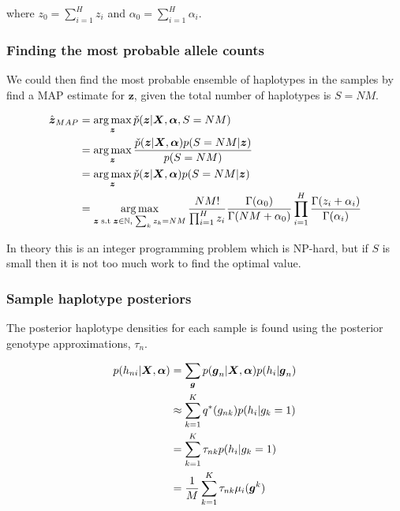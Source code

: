 \documentclass{article}
\DeclareMathOperator*{\argmax}{arg\,max}
\begin{document}
where $z_0 = \sum_{i = 1}^H z_i$ and $\alpha_0 = \sum_{i = 1}^H \alpha_i$.

\subsubsection{Finding the most probable allele counts}

We could then find the most probable ensemble of haplotypes in the samples by find a MAP estimate for $\boldsymbol{z}$, given the total number of haplotypes is $S = NM$.

\begin{align}
    \hat{\boldsymbol{z}}_{MAP} &= \argmax_{\boldsymbol{z}} \check{p}(\boldsymbol{z} | \boldsymbol{X}, \boldsymbol{\alpha}, S = NM)\notag\\
    &= \argmax_{\boldsymbol{z}} \frac{\check{p}(\boldsymbol{z} | \boldsymbol{X}, \boldsymbol{\alpha})p(S = NM | \boldsymbol{z})}{p(S = NM)}\notag\\
    &= \argmax_{\boldsymbol{z}} \check{p}(\boldsymbol{z} | \boldsymbol{X}, \boldsymbol{\alpha})p(S = NM | \boldsymbol{z})\notag\\
    &= \argmax_{\boldsymbol{z} \; \text{s.t} \; \boldsymbol{z} \in \mathbb{N},\; \sum_k z_k = NM} \frac{NM!}{\prod_{i = 1}^{H} z_i} \frac{\Gamma(\alpha_0)}{\Gamma(NM + \alpha_0)} \prod_{i = 1}^H \frac{\Gamma(z_i + \alpha_i)}{\Gamma(\alpha_i)}
\end{align}

In theory this is an integer programming problem which is NP-hard, but if $S$ is small then it is not too much work to find the optimal value.

\subsubsection{Sample haplotype posteriors}

The posterior haplotype densities for each sample is found using the posterior genotype approximations, $\tau_{n}$.

\begin{align}
\label{eq:sh_pp}
p(h_{ni} | \boldsymbol{X}, \boldsymbol{\alpha}) &= \sum_{\boldsymbol{g}} p(\boldsymbol{g}_n | \boldsymbol{X}, \boldsymbol{\alpha}) p(h_{i} | \boldsymbol{g}_n) \notag \\
    &\approx \sum_{k = 1}^K q^*(g_{nk}) p(h_{i} | g_k = 1) \notag \\
    &= \sum_{k = 1}^K \tau_{nk} p(h_{i} | g_k = 1) \notag \\
    &= \frac{1}{M}\sum_{k = 1}^K \tau_{nk}\mu_i(\boldsymbol{g}^k)
\end{align}
\end{document}

